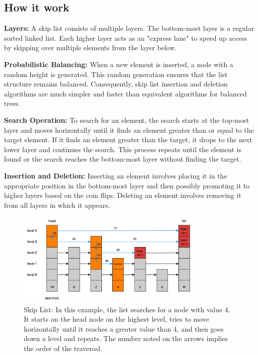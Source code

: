 \subsection*{How it work}

\textbf{Layers:} A skip list consists of multiple layers. The bottom-most layer is a regular sorted linked list. Each higher layer acts as an "express lane" to speed up access by skipping over multiple elements from the layer below.

\textbf{Probabilistic Balancing:} When a new element is inserted, a node with a random height is generated. This random generation ensures that the list structure remains balanced. Consequently, skip list insertion and deletion algorithms are much simpler and faster than equivalent algorithms for balanced trees.

\textbf{Search Operation:} To search for an element, the search starts at the top-most layer and moves horizontally until it finds an element greater than or equal to the target element. If it finds an element greater than the target, it drops to the next lower layer and continues the search. This process repeats until the element is found or the search reaches the bottom-most layer without finding the target.

\textbf{Insertion and Deletion:} Inserting an element involves placing it in the appropriate position in the bottom-most layer and then possibly promoting it to higher layers based on the coin flips. Deleting an element involves removing it from all layers in which it appears.

\begin{figure}[h]
    \centering
    \includegraphics[width=0.8\textwidth]{./figures/skiplistsearch.jpg}
    \caption{Skip List: In this example, the list searches for a node with value 4. It starts on the head node on the highest level, tries to move horizontally until it reaches a greater value than 4, and then goes down a level and repeats. The number noted on the arrows implies the order of the traversal.}
    \label{fig:skiplistsearch}
\end{figure}

